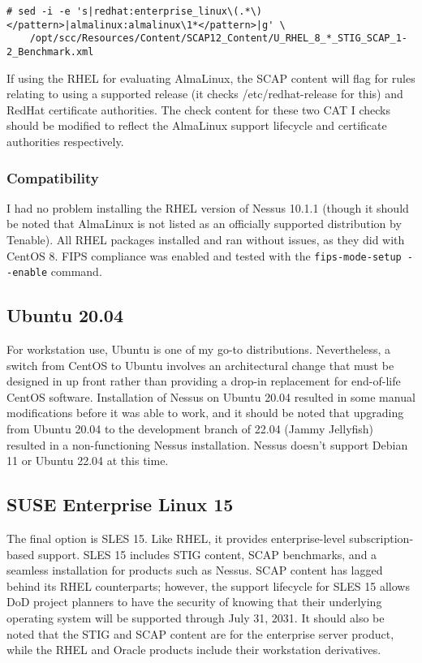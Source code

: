 \begin{lstlisting}[caption={Modify RHEL Benchmark for AlmaLinux},captionpos=b,style=BashStyle,basicstyle=\small,label={lst:20220321:alma},literate=*{-}{-}1,breaklines=true]
# sed -i -e 's|redhat:enterprise_linux\(.*\)</pattern>|almalinux:almalinux\1*</pattern>|g' \
	/opt/scc/Resources/Content/SCAP12_Content/U_RHEL_8_*_STIG_SCAP_1-2_Benchmark.xml
\end{lstlisting}

If using the RHEL for evaluating AlmaLinux, the SCAP content will flag for rules relating to using a supported release (it checks /etc/redhat-release for this) and RedHat certificate authorities. The check content for these two CAT I checks should be modified to reflect the AlmaLinux support lifecycle and certificate authorities respectively.

\subsubsection{Compatibility}
I had no problem installing the RHEL version of Nessus 10.1.1 (though it should be noted that AlmaLinux is not listed as an officially supported distribution by Tenable). All RHEL packages installed and ran without issues, as they did with CentOS 8. FIPS compliance was enabled and tested with the \texttt{fips-mode-setup -\phantom{}-enable} command.

\subsection{Ubuntu 20.04}

For workstation use, Ubuntu is one of my go-to distributions. Nevertheless, a switch from CentOS to Ubuntu involves an architectural change that must be designed in up front rather than providing a drop-in replacement for end-of-life CentOS software. Installation of Nessus on Ubuntu 20.04 resulted in some manual modifications before it was able to work, and it should be noted that upgrading from Ubuntu 20.04 to the development branch of 22.04 (Jammy Jellyfish) resulted in a non-functioning Nessus installation. Nessus doesn't support Debian 11 or Ubuntu 22.04 at this time.

\subsection{SUSE Enterprise Linux 15}

The final option is SLES 15. Like RHEL, it provides enterprise-level subscription-based support. SLES 15 includes STIG content, SCAP benchmarks, and a seamless installation for products such as Nessus. SCAP content has lagged behind its RHEL counterparts; however, the support lifecycle for SLES 15 allows DoD project planners to have the security of knowing that their underlying operating system will be supported through July 31, 2031. It should also be noted that the STIG and SCAP content are for the enterprise server product, while the RHEL and Oracle products include their workstation derivatives.

